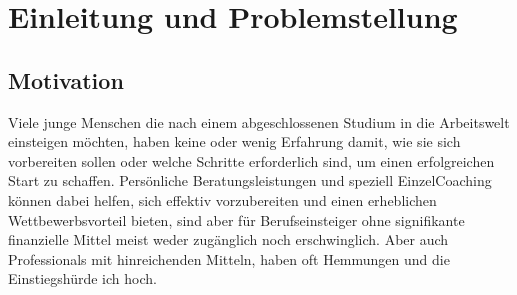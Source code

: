 \chapter{Einleitung und Problemstellung}

    \label{Motivation}
    \section{Motivation}
        
        Viele junge Menschen die nach einem abgeschlossenen Studium in die Arbeitswelt einsteigen möchten, haben keine oder wenig Erfahrung damit, wie sie sich vorbereiten sollen oder welche Schritte erforderlich sind, um einen erfolgreichen Start zu schaffen. Persönliche Beratungsleistungen und speziell Einzel\-Coaching können dabei helfen, sich effektiv vorzubereiten und einen erheblichen Wettbewerbsvorteil bieten, sind aber für Berufseinsteiger ohne signifikante finanzielle Mittel meist weder zugänglich noch erschwinglich. Aber auch Professionals mit hinreichenden Mitteln, haben oft Hemmungen und die Einstiegshürde ich hoch.\\
        
